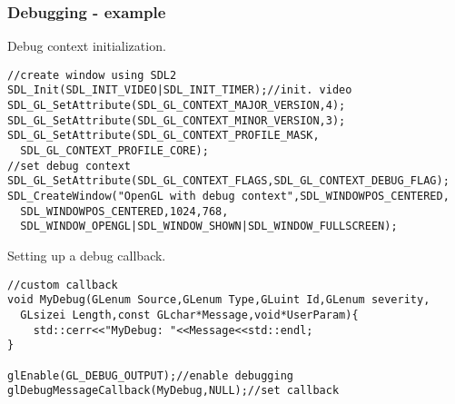 \begin{frame}[fragile]
\frametitle{Debugging - example}
Debug context initialization.
{\scriptsize
\begin{verbatim}
//create window using SDL2
SDL_Init(SDL_INIT_VIDEO|SDL_INIT_TIMER);//init. video
SDL_GL_SetAttribute(SDL_GL_CONTEXT_MAJOR_VERSION,4);
SDL_GL_SetAttribute(SDL_GL_CONTEXT_MINOR_VERSION,3);
SDL_GL_SetAttribute(SDL_GL_CONTEXT_PROFILE_MASK,
  SDL_GL_CONTEXT_PROFILE_CORE);
//set debug context
SDL_GL_SetAttribute(SDL_GL_CONTEXT_FLAGS,SDL_GL_CONTEXT_DEBUG_FLAG);
SDL_CreateWindow("OpenGL with debug context",SDL_WINDOWPOS_CENTERED,
  SDL_WINDOWPOS_CENTERED,1024,768,
  SDL_WINDOW_OPENGL|SDL_WINDOW_SHOWN|SDL_WINDOW_FULLSCREEN);
\end{verbatim}
}
Setting up a debug callback.
{\scriptsize
\begin{verbatim}
//custom callback
void MyDebug(GLenum Source,GLenum Type,GLuint Id,GLenum severity,
  GLsizei Length,const GLchar*Message,void*UserParam){
    std::cerr<<"MyDebug: "<<Message<<std::endl;
}

glEnable(GL_DEBUG_OUTPUT);//enable debugging
glDebugMessageCallback(MyDebug,NULL);//set callback
\end{verbatim}
}
\end{frame}


